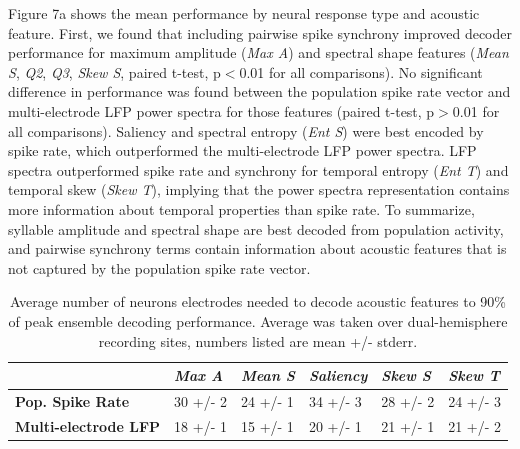 Figure 7a shows the mean performance by neural response type and acoustic feature. First, we found that including pairwise spike synchrony improved decoder performance for maximum amplitude ({\em Max A}) and spectral shape features ({\em Mean S}, {\em Q2}, {\em Q3}, {\em Skew S}, paired t-test, p$<$0.01 for all comparisons). No significant difference in performance was found between the population spike rate vector and multi-electrode LFP power spectra for those features (paired t-test, p$>$0.01 for all comparisons). Saliency and spectral entropy ({\em Ent S}) were best encoded by spike rate, which outperformed the multi-electrode LFP power spectra. LFP spectra outperformed spike rate and synchrony for temporal entropy ({\em Ent T}) and temporal skew ({\em Skew T}), implying that the power spectra representation contains more information about temporal properties than spike rate. To summarize, syllable amplitude and spectral shape are best decoded from population activity, and pairwise synchrony terms contain information about acoustic features that is not captured by the population spike rate vector.

\begin{table}
\begin{center}
\begin{tabular}{|p{2.4cm}|p{2.4cm}|p{2.4cm}|p{2.4cm}|p{2.4cm}|p{2.2cm} |}
\hline
 & \textbf{\em Max A} & \textbf{\em Mean S} &
\textbf{\em Saliency} & \textbf{\em Skew S} &
\textbf{\em Skew T} \\
\hline 
\textbf{Pop. Spike Rate} & 30 +/- 2 & 24 +/- 1 & 34 +/- 3 & 28 +/- 2 & 24 +/- 3 \\
\hline 
\textbf{Multi-electrode LFP} & 18 +/- 1 & 15 +/- 1 & 20 +/- 1 & 21 +/- 1 & 21 +/- 2 \\
\hline
\end{tabular}
\end{center}
\caption{ Average number of neurons electrodes needed to decode acoustic features to 90\% of peak ensemble decoding performance. Average was taken over dual-hemisphere recording sites, numbers listed are mean +/- stderr.}
\end{table}

